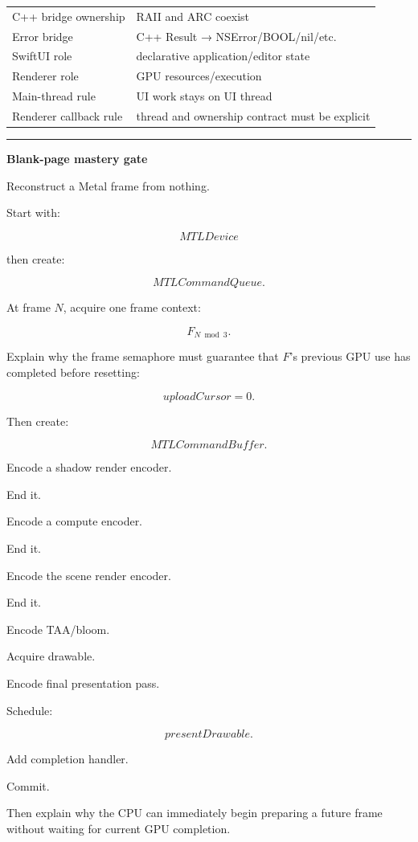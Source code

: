 {\begin{longtable}[]{@{}
  >{\raggedright\arraybackslash}p{}
  >{\raggedright\arraybackslash}p{}@{}}
C++ bridge ownership & RAII and ARC coexist \\
Error bridge & C++ Result → NSError/BOOL/nil/etc. \\
SwiftUI role & declarative application/editor state \\
Renderer role & GPU resources/execution \\
Main-thread rule & UI work stays on UI thread \\
Renderer callback rule & thread and ownership contract must be explicit \\
\end{longtable}
}

\begin{center}\rule{0.5\linewidth}{0.5pt}\end{center}

\textbf{Blank-page mastery gate}

Reconstruct a Metal frame from nothing.

Start with:

\[
MTLDevice
\]

then create:

\[
MTLCommandQueue.
\]

At frame \(N\), acquire one frame context:

\[
F_{N\bmod3}.
\]

Explain why the frame semaphore must guarantee that \(F\)'s previous GPU use has completed before resetting:

\[
uploadCursor=0.
\]

Then create:

\[
MTLCommandBuffer.
\]

Encode a shadow render encoder.

End it.

Encode a compute encoder.

End it.

Encode the scene render encoder.

End it.

Encode TAA/bloom.

Acquire drawable.

Encode final presentation pass.

Schedule:

\[
presentDrawable.
\]

Add completion handler.

Commit.

Then explain why the CPU can immediately begin preparing a future frame without waiting for current GPU completion.

